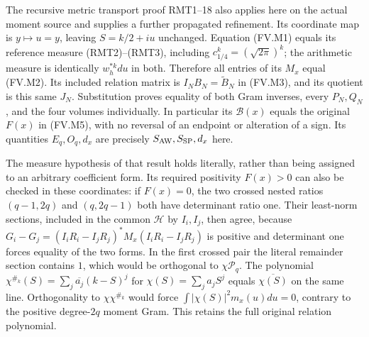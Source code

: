 The recursive metric transport proof RMT1--18 also applies here on the
actual moment source and supplies a further propagated refinement.
Its coordinate map is $y\mapsto u=y$, leaving $S=k/2+iu$ unchanged.
Equation (FV.M1) equals its reference measure (RMT2)--(RMT3), including
$c_{1/4}^k=(\sqrt{2\pi})^k$; the arithmetic measure is identically
$w_h^{*k}du$ in both. Therefore all entries of its $M_x$ equal (FV.M2).
Its included relation matrix is $I_NB_N=\widetilde B_N$ in (FV.M3),
and its quotient is this same $J_N$. Substitution proves equality of
both Gram inverses, every $P_N,Q_N$, and the four volumes individually.
In particular its $\mathcal B(x)$ equals the original $F(x)$ in (FV.M5),
with no reversal of an endpoint or alteration of a sign. Its quantities
$E_q,O_q,d_x$ are precisely $S_{\rm AW},S_{\rm SP},d_x$ here.

The measure hypothesis of that result holds literally, rather than being
assigned to an arbitrary coefficient form. Its required positivity
$F(x)>0$ can also be checked in these coordinates: if $F(x)=0$,
the two crossed nested ratios $(q-1,2q)$ and $(q,2q-1)$ both have
determinant ratio one. Their least-norm sections, included in the common
$\mathcal H$ by $I_i,I_j$, then agree, because
$G_i-G_j=(I_iR_i-I_jR_j)^*M_x(I_iR_i-I_jR_j)$ is positive and determinant one
forces equality of the two forms. In the first crossed pair the literal
remainder section contains $1$, which would be orthogonal to
$\chi\mathcal P_q$. The polynomial
$\chi^{\#_k}(S)=\sum_j\overline{a_j}(k-S)^j$ for
$\chi(S)=\sum_j a_jS^j$ equals $\overline{\chi(S)}$ on the same
line. Orthogonality to $\chi\chi^{\#_k}$ would force
$\int|\chi(S)|^2m_x(u)du=0$, contrary to the positive degree-$2q$
moment Gram. This retains the full original relation polynomial.


